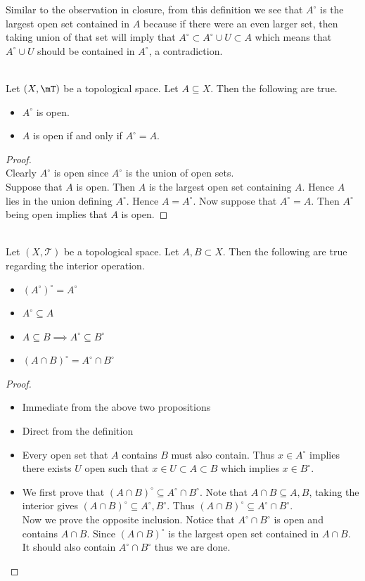 \documentclass[a4paper]{article}
\begin{document}
Similar to the observation in closure, from this definition we see that $A^\circ$ is the largest open set contained in $A$ because if there were an even larger set, then taking union of that set will imply that $A^\circ\subset A^\circ\cup U\subset A$ which means that $A^\circ\cup U$ should be contained in $A^\circ$, a contradiction. 

\begin{prp}{}{}\\
Let $(X,\mT)$ be a topological space. Let $A\subseteq X$. Then the following are true. 
\begin{itemize}
\item $A^\circ$ is open. 
\item $A$ is open if and only if $A^\circ=A$. 
\end{itemize}
\begin{proof}\\
Clearly $A^\circ$ is open since $A^\circ$ is the union of open sets. \\

Suppose that $A$ is open. Then $A$ is the largest open set containing $A$. Hence $A$ lies in the union defining $A^\circ$. Hence $A=A^\circ$. Now suppose that $A^\circ=A$. Then $A^\circ$ being open implies that $A$ is open. 
\end{proof}
\end{prp}

\begin{prp}{}{}\\
Let $(X,\mathcal{T})$ be a topological space. Let $A,B\subset X$. Then the following are true regarding the interior operation. 
\begin{itemize}
\item $(A^\circ)^\circ=A^\circ$
\item $A^\circ\subseteq A$
\item $A\subseteq B\implies A^\circ\subseteq B^\circ$
\item $(A\cap B)^\circ=A^\circ\cap B^\circ$
\end{itemize}
\begin{proof}\\
\begin{itemize}
\item Immediate from the above two propositions
\item Direct from the definition
\item Every open set that $A$ contains $B$ must also contain. Thus $x\in A^\circ$ implies there exists $U$ open such that $x\in U\subset A\subset B$ which implies $x\in B^\circ$. 
\item We first prove that $(A\cap B)^\circ\subseteq A^\circ\cap B^\circ$. Note that $A\cap B\subseteq A,B$, taking the interior gives $(A\cap B)^\circ\subseteq A^\circ,B^\circ$. Thus $(A\cap B)^\circ\subseteq A^\circ\cap B^\circ$. \\
Now we prove the opposite inclusion. Notice that $A^\circ\cap B^\circ$ is open and contains $A\cap B$. Since $(A\cap B)^\circ$ is the largest open set contained in $A\cap B$. It should also contain $A^\circ\cap B^\circ$ thus we are done. 
\end{itemize}
\end{proof}
\end{prp}
\end{document}
